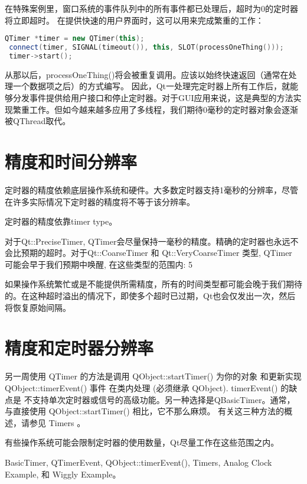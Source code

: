 在特殊案例里，窗口系统的事件队列中的所有事件都已处理后，超时为0的定时器将立即超时。 在提供快速的用户界面时，这可以用来完成繁重的工作：

\begin{lstlisting}[language=C++]
 QTimer *timer = new QTimer(this);
 connect(timer, SIGNAL(timeout()), this, SLOT(processOneThing()));
 timer->start();
\end{lstlisting}

从那以后，processOneThing()将会被重复调用。应该以始终快速返回（通常在处理一个数据项之后）的方式编写。 因此，Qt一处理完定时器上所有工作后，就能够分发事件提供给用户接口和停止定时器。对于GUI应用来说，这是典型的方法实现繁重工作。但如今越来越多应用了多线程，我们期待0毫秒的定时器对象会逐渐被QThread取代。

\section{精度和时间分辨率}

定时器的精度依赖底层操作系统和硬件。大多数定时器支持1毫秒的分辨率，尽管在许多实际情况下定时器的精度将不等于该分辨率。

定时器的精度依靠timer type。

对于Qt::PreciseTimer, QTimer会尽量保持一毫秒的精度。精确的定时器也永远不会比预期的超时。对于Qt::CoarseTimer 和 Qt::VeryCoarseTimer 类型, QTimer 可能会早于我们预期中唤醒, 在这些类型的范围内: 5%

如果操作系统繁忙或是不能提供所需精度，所有的时间类型都可能会晚于我们期待的。在这种超时溢出的情况下，即使多个超时已过期，Qt也会仅发出一次，然后将恢复原始间隔。

\section{精度和定时器分辨率}

另一周使用 QTimer 的方法是调用 QObject::startTimer() 为你的对象 和更新实现QObject::timerEvent() 事件 在类内处理 (必须继承 QObject). timerEvent() 的缺点是 不支持单次定时器或信号的高级功能。另一种选择是QBasicTimer。通常，与直接使用 QObject::startTimer() 相比，它不那么麻烦。 有关这三种方法的概述，请参见 Timers 。

有些操作系统可能会限制定时器的使用数量，Qt尽量工作在这些范围之内。

\begin{seeAlso}
BasicTimer, QTimerEvent, QObject::timerEvent(), Timers, Analog Clock Example, 和 Wiggly Example。
\end{seeAlso}

